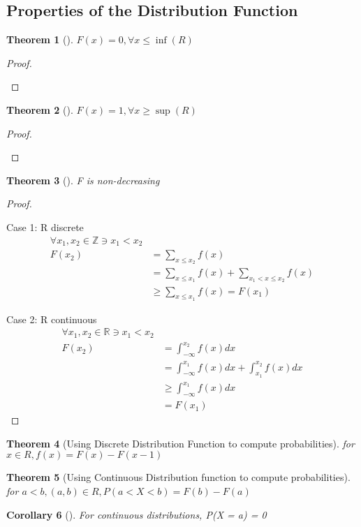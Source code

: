\documentclass[10pt,]{book}
\theoremstyle{plain}
\newtheorem{theorem}{Theorem}[section]
\newtheorem{corollary}[theorem]{Corollary}
\theoremstyle{definition}
\theoremstyle{definition}
\numberwithin{equation}{section}
\newcommand{\lt}{ < }
\begin{document}
\subsection[Properties of the Distribution Function]{Properties of the Distribution Function}\label{subsection-9}
\begin{theorem}[]\label{theorem-Fmin}
\(F(x)=0, \forall x \le \inf(R)\)\end{theorem}
\begin{proof}\hypertarget{proof-9}{}
\end{proof}
\begin{theorem}[]\label{theorem-Fmax}
\(F(x)=1, \forall x \ge \sup(R)\)\end{theorem}
\begin{proof}\hypertarget{proof-10}{}
\end{proof}
\begin{theorem}[]\label{theorem-11}
F is non-decreasing\end{theorem}
\begin{proof}\hypertarget{proof-11}{}
Case 1: R discrete%
\begin{align*}
\forall x_1,x_2 \in \mathbb{Z} \ni x_1 \lt x_2\\
F(x_2) & = \sum_{x \le x_2} f(x) \\
& = \sum_{x \le x_1} f(x) + \sum_{x_1 \lt x \le x_2} f(x)\\
& \ge \sum_{x \le x_1} f(x) = F(x_1)
\end{align*}\par
Case 2: R continuous%
\begin{align*}
\forall x_1,x_2 \in \mathbb{R} \ni x_1 \lt x_2\\
F(x_2) & = \int_{-\infty}^{x_2} f(x) dx \\
 & = \int_{-\infty}^{x_1} f(x) dx + \int_{x_1}^{x_2} f(x) dx\\
 & \ge \int_{-\infty}^{x_1} f(x) dx\\
 & = F(x_1)
\end{align*}\end{proof}
\begin{theorem}[Using Discrete Distribution Function to compute probabilities]\label{theorem-Fvsf-discrete}
for \(x \in R, f(x) = F(x) - F(x-1)\)\end{theorem}
\begin{theorem}[Using Continuous Distribution function to compute probabilities]\label{theorem-Fvsf-continuyous}
for \(a \lt b, (a,b) \in R, P(a \lt X \lt b) = F(b) - F(a)\)\end{theorem}
\begin{corollary}[]\label{corollary-ProbPointZero-continuous}
For continuous distributions, P(X = a) = 0\end{corollary}
\typeout{************************************************}
\typeout{************************************************}
\end{document}
